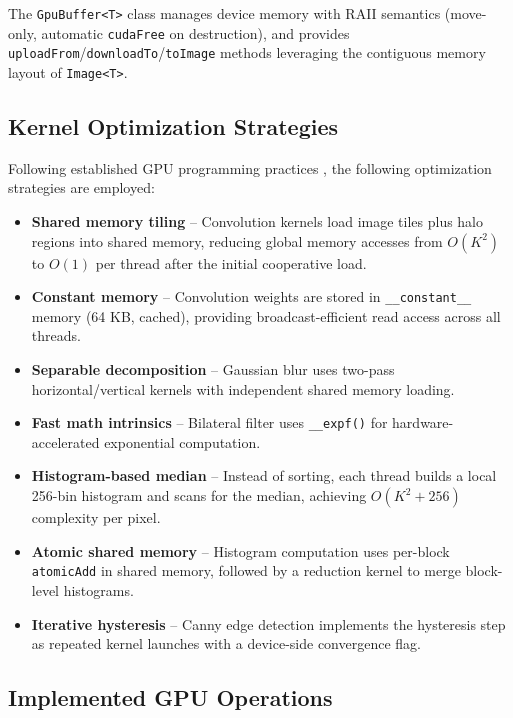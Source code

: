 \documentclass[9pt,a4paper,twocolumn,twoside]{rho-class/rho}
\begin{document}
        The \texttt{GpuBuffer<T>} class manages device memory with RAII semantics (move-only, automatic \texttt{cudaFree} on destruction), and provides \texttt{uploadFrom}/\texttt{downloadTo}/\texttt{toImage} methods leveraging the contiguous memory layout of \texttt{Image<T>}.

    \subsection{Kernel Optimization Strategies}

        Following established GPU programming practices \cite{kirk2016programming}, the following optimization strategies are employed:

        \begin{itemize}
            \item \textbf{Shared memory tiling} -- Convolution kernels load image tiles plus halo regions into shared memory, reducing global memory accesses from $O(K^2)$ to $O(1)$ per thread after the initial cooperative load.
            \item \textbf{Constant memory} -- Convolution weights are stored in \texttt{\_\_constant\_\_} memory (64 KB, cached), providing broadcast-efficient read access across all threads.
            \item \textbf{Separable decomposition} -- Gaussian blur uses two-pass horizontal/vertical kernels with independent shared memory loading.
            \item \textbf{Fast math intrinsics} -- Bilateral filter uses \texttt{\_\_expf()} for hardware-accelerated exponential computation.
            \item \textbf{Histogram-based median} -- Instead of sorting, each thread builds a local 256-bin histogram and scans for the median, achieving $O(K^2 + 256)$ complexity per pixel.
            \item \textbf{Atomic shared memory} -- Histogram computation uses per-block \texttt{atomicAdd} in shared memory, followed by a reduction kernel to merge block-level histograms.
            \item \textbf{Iterative hysteresis} -- Canny edge detection implements the hysteresis step as repeated kernel launches with a device-side convergence flag.
        \end{itemize}

    \subsection{Implemented GPU Operations}
\end{document}
